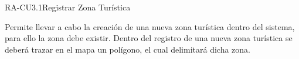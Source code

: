 
% 



	\begin{UseCase}{RA-CU3.1}{Registrar Zona Turística}{
		
		Permite llevar a cabo la creación de una nueva zona turística dentro del sistema, para ello la zona debe existir. Dentro del registro de una nueva zona turística se deberá trazar en el mapa un polígono, el cual delimitará dicha zona. \\
		
}
\end{UseCase}
